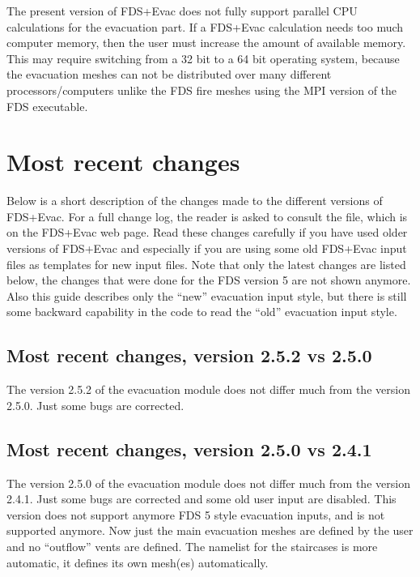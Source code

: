 \documentclass[12pt,a4paper,final,twoside]{stylevk}
\begin{document}
The present version of FDS+Evac does not fully support parallel CPU
calculations for the evacuation part.  If a FDS+Evac calculation needs
too much computer memory, then the user must increase the amount of
available memory.  This may require switching from a 32 bit to a 64
bit operating system, because the evacuation meshes can not be
distributed over many different processors/computers unlike the FDS
fire meshes using the MPI version of the FDS executable.



\section{Most recent changes}\label{Sec_RecentChanges}

\noindent Below is a short description of the changes made to the
different versions of FDS+Evac.  For a full change log, the reader is
asked to consult the  file, which is on the FDS+Evac
web page.  Read these changes carefully if you have used older
versions of FDS+Evac and especially if you are using some old FDS+Evac
input files as templates for new input files.  Note that only the
latest changes are listed below, the changes that were done for the
FDS version 5 are not shown anymore.  Also this guide describes only
the ``new'' evacuation input style, but there is still some backward
capability in the code to read the ``old'' evacuation input style.


\subsection{Most recent changes, version 2.5.2 vs
  2.5.0}\label{Sec_252vs250} 

\noindent The version 2.5.2 of the evacuation module does not differ
much from the version 2.5.0.  Just some bugs are corrected.

\subsection{Most recent changes, version 2.5.0 vs
  2.4.1}\label{Sec_250vs241} 

\noindent The version 2.5.0 of the evacuation module does not differ
much from the version 2.4.1.  Just some bugs are corrected and some
old user input are disabled.  This version does not support anymore
FDS 5 style evacuation inputs, and  is not supported anymore.  Now just the main evacuation meshes
are defined by the user and no ``outflow'' vents are defined.  The
 namelist for the staircases is more automatic, it defines
its own mesh(es) automatically.
\end{document}
